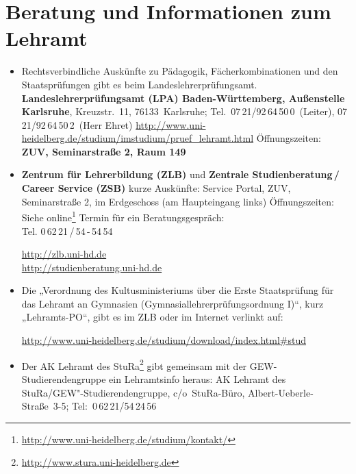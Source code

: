 \section{Beratung und Informationen zum Lehramt}
\begin{itemize}
\item Rechtsverbindliche Auskünfte zu Pädagogik, Fächerkombinationen und
      den Staatsprüfungen gibt es beim Landeslehrerprüfungsamt. \newline
      \textbf{Landeslehrerprüfungsamt (LPA) Baden-Württemberg,
           Außenstelle Karlsruhe},
      Kreuzstr.~11, 76133~Karlsruhe; \newline
Tel.~07\,21/92\,64\,50\,0~(Leiter), 07\,21/92\,64\,50\,2~(Herr Ehret) \newline
      \url{http://www.uni-heidelberg.de/studium/imstudium/pruef_lehramt.html} \newline
      Öffnungszeiten: \beratungpaedagogik \newline
      \textbf{\gls{ZUV}, Seminarstraße 2, Raum 149}


\item \textbf{Zentrum für Lehrerbildung (ZLB)} und \textbf{Zentrale Studienberatung\,/\,Career Service (ZSB)} \newline
      kurze Auskünfte: Service Portal, \gls{ZUV}, Seminarstraße 2, im Erdgeschoss (am Haupteingang links)
      Öffnungszeiten: Siehe online\footnote{\url{http://www.uni-heidelberg.de/studium/kontakt/}} \newline
      Termin für ein Beratungsgespräch: \\ Tel. 0\,62\,21\,/\,54\,-\,54\,54

      \url{http://zlb.uni-hd.de}\\
      \url{http://studienberatung.uni-hd.de}

\item Die „Verordnung des Kultusministeriums über die Erste Staatsprüfung für das Lehramt an Gymnasien (Gymnasiallehrerprüfungsordnung I)“, kurz „Lehramts-PO“, gibt es im ZLB oder im Internet verlinkt auf:

      \url{http://www.uni-heidelberg.de/studium/download/index.html#stud}


\item Der AK Lehramt des StuRa\footnote{\url{http://www.stura.uni-heidelberg.de}} gibt gemeinsam mit der  GEW-Stu\-dier\-en\-den\-grup\-pe ein Lehramtsinfo heraus: \newline AK Lehramt des StuRa/GEW"-Studierendengruppe, c/o~StuRa-Büro, Albert-Ueberle-Straße~3-5; Tel:~0\,62\,21/54\,24\,56


\end{itemize}
